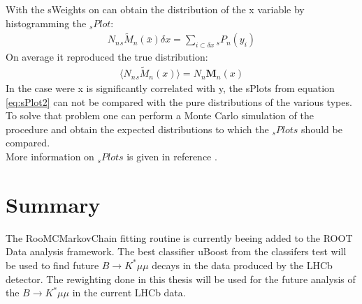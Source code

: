 \documentclass[english]{uzhpub}
\begin{document}
 With the sWeights on can obtain the distribution of the x variable by histogramming the $_s Plot$:
 \begin{align}
  N_n { }_{s} \tilde{M}_n (\bar{x}) \delta x = \sum_{i \subset \delta x} { }_{s} P_n (y_i) \label{eq:sPlot2}
 \end{align}
 On average it reproduced the true distribution:
 \begin{align}
  \langle N_n { }_s \tilde{M}_n (x) \rangle = N_n \textbf{M}_n (x)
 \end{align}
In the case were x is significantly correlated with y, the sPlots from equation \ref{eq:sPlot2} can not be compared with the pure distributions of the various types. To solve that problem one can perform a Monte Carlo simulation of the procedure and obtain the expected distributions to which the $_s Plots$ should be compared. \\
More information on $_s Plots$ is given in reference \cite{bib:sPlot}.

\section{Summary}
The RooMCMarkovChain fitting routine is currently beeing added \cite{bib:pull} to the ROOT Data analysis framework. The best classifier uBoost from the classifers test will be used to find future $B \rightarrow K^* \mu \mu$ decays in the data produced by the LHCb detector. The rewighting done in this thesis will be used for the future analysis of the $B \rightarrow K^* \mu \mu$ in the current LHCb data.
\end{document}
